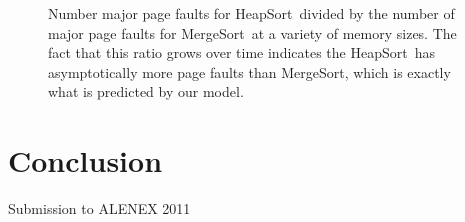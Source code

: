 \documentclass{acmtrans2m}
\newcommand{\heapsort}{{\sc HeapSort}}
\newcommand{\mergesort}{{\sc MergeSort}}
\begin{document}
\begin{figure}

\caption{Number major page faults for \heapsort\ divided by the number of major page faults for \mergesort\ at a variety of memory sizes.  The fact that this ratio grows over time indicates the \heapsort\ has asymptotically more page faults than \mergesort, which is exactly what is predicted by our model.}
\end{figure}

\section{Conclusion}




\begin{received} 
Submission to ALENEX 2011
\end{received}
\end{document}
